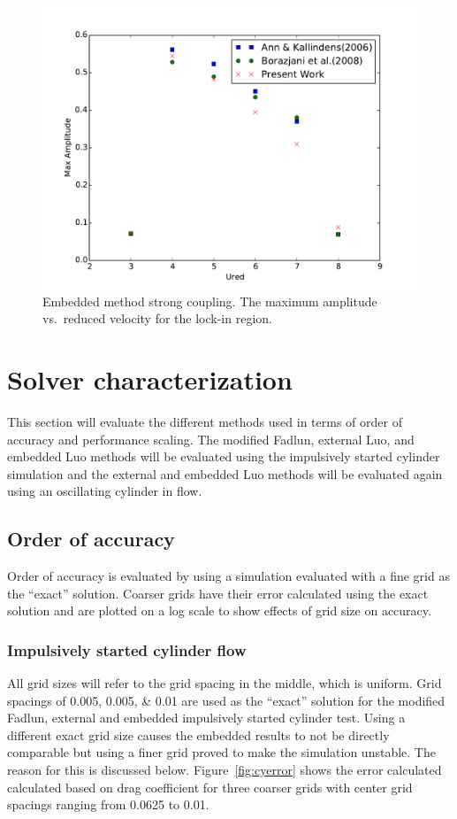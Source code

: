 \begin{figure}
	\centering
	\includegraphics[width=\textwidth]{vivemsc}
	\caption{Embedded method strong coupling. The maximum amplitude vs.~reduced velocity for the lock-in region.}
	\label{fig:viv4}
\end{figure}

\chapter{Solver characterization}
\label{chapter:error}
This section will evaluate the different methods used in terms of order of accuracy and performance scaling. 
The modified Fadlun, external Luo, and embedded Luo methods will be evaluated using the impulsively started cylinder simulation and the external and embedded Luo methods will be evaluated again using an oscillating cylinder in flow. 

\section{Order of accuracy}
Order of accuracy is evaluated by using a simulation evaluated with a fine grid as the ``exact'' solution.
Coarser grids have their error calculated using the exact solution and are plotted on a log scale to show effects of grid size on accuracy.

\subsection{Impulsively started cylinder flow}
All grid sizes will refer to the grid spacing in the middle, which is uniform. 
Grid spacings of \numlist{0.005; 0.005; 0.01} are used as the ``exact'' solution for the modified Fadlun, external and embedded impulsively started cylinder test. 
Using a different exact grid size causes the embedded results to not be directly comparable but using a finer grid proved to make the simulation unstable. 
The reason for this is discussed below. 
Figure~\ref{fig:cyerror} shows the error calculated calculated based on drag coefficient for three coarser grids with center grid spacings ranging from 0.0625 to 0.01. 

